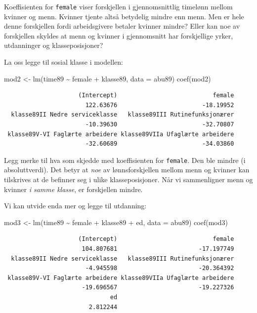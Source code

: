 \documentclass[
  norsk,
  letterpaper,
  DIV=11,
  numbers=noendperiod]{scrreprt}
\newenvironment{Shaded}{\begin{snugshade}}{\end{snugshade}}
\newcommand{\AttributeTok}[1]{\textcolor[rgb]{0.40,0.45,0.13}{#1}}
\newcommand{\FunctionTok}[1]{\textcolor[rgb]{0.28,0.35,0.67}{#1}}
\newcommand{\NormalTok}[1]{\textcolor[rgb]{0.00,0.23,0.31}{#1}}
\newcommand{\OtherTok}[1]{\textcolor[rgb]{0.00,0.23,0.31}{#1}}
\newcommand{\SpecialCharTok}[1]{\textcolor[rgb]{0.37,0.37,0.37}{#1}}
\theoremstyle{definition}
\theoremstyle{remark}
\begin{document}
Koeffisienten for \texttt{female} viser forskjellen i gjennomsnittlig
timelønn mellom kvinner og menn. Kvinner tjente altså betydelig mindre
enn menn. Men er hele denne forskjellen fordi arbeidsgivere betaler
kvinner mindre? Eller kan noe av forskjellen skyldes at menn og kvinner
i gjennomsnitt har forskjellige yrker, utdanninger og klasseposisjoner?

La oss legge til sosial klasse i modellen:

\begin{Shaded}
\begin{Highlighting}[]
\NormalTok{mod2 }\OtherTok{\textless{}{-}} \FunctionTok{lm}\NormalTok{(time89 }\SpecialCharTok{\textasciitilde{}}\NormalTok{ female }\SpecialCharTok{+}\NormalTok{ klasse89, }\AttributeTok{data =}\NormalTok{ abu89)}
\FunctionTok{coef}\NormalTok{(mod2)}
\end{Highlighting}
\end{Shaded}

\begin{verbatim}
                     (Intercept)                           female 
                       122.63676                        -18.19952 
  klasse89II Nedre serviceklasse   klasse89III Rutinefunksjonærer 
                       -10.39630                        -32.70807 
 klasse89V-VI Faglærte arbeidere klasse89VIIa Ufaglærte arbeidere 
                       -32.60689                        -34.03860 
\end{verbatim}

Legg merke til hva som skjedde med koeffisienten for \texttt{female}.
Den ble mindre (i absoluttverdi). Det betyr at \emph{noe} av
lønnsforskjellen mellom menn og kvinner kan tilskrives at de befinner
seg i ulike klasseposisjoner. Når vi sammenligner menn og kvinner
\emph{i samme klasse}, er forskjellen mindre.

Vi kan utvide enda mer og legge til utdanning:

\begin{Shaded}
\begin{Highlighting}[]
\NormalTok{mod3 }\OtherTok{\textless{}{-}} \FunctionTok{lm}\NormalTok{(time89 }\SpecialCharTok{\textasciitilde{}}\NormalTok{ female }\SpecialCharTok{+}\NormalTok{ klasse89 }\SpecialCharTok{+}\NormalTok{ ed, }\AttributeTok{data =}\NormalTok{ abu89)}
\FunctionTok{coef}\NormalTok{(mod3)}
\end{Highlighting}
\end{Shaded}

\begin{verbatim}
                     (Intercept)                           female 
                      104.807681                       -17.197749 
  klasse89II Nedre serviceklasse   klasse89III Rutinefunksjonærer 
                       -4.945598                       -20.364392 
 klasse89V-VI Faglærte arbeidere klasse89VIIa Ufaglærte arbeidere 
                      -19.696567                       -19.227326 
                              ed 
                        2.812244 
\end{verbatim}
\end{document}
